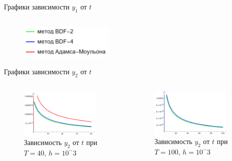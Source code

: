 \documentclass[ignoreonframetext,unicode]{beamer}
\begin{document}
\begin{frame}{Графики зависимости $y_1$ от $t$}
\begin{columns}
	\end{columns}

	\begin{figure}[!htbp]
		\centering
		\includegraphics[width=0.4\textwidth]{graph-legend}%
	\end{figure}

\end{frame}

\begin{frame}{Графики зависимости $y_2$ от $t$}
	\begin{columns}
		
		\begin{figure}[!htbp]
			\centering
			\includegraphics[width=0.9\textwidth]{T40-2}%
			\caption{Зависимость $y_2$ от $t$ при $T = 40$, $h = 10^-3$}
			\vspace*{-2mm}
			\label{T40-2}
		\end{figure}
		
		\begin{figure}[!htbp]
			\centering
			\includegraphics[width=0.9\textwidth]{T100-2}%
			\caption{Зависимость $y_2$ от $t$ при $T = 100$, $h = 10^-3$}
			\vspace*{-2mm}
			\label{T100-2}
		\end{figure}
	

\end{columns}
\end{frame}
\end{document}
